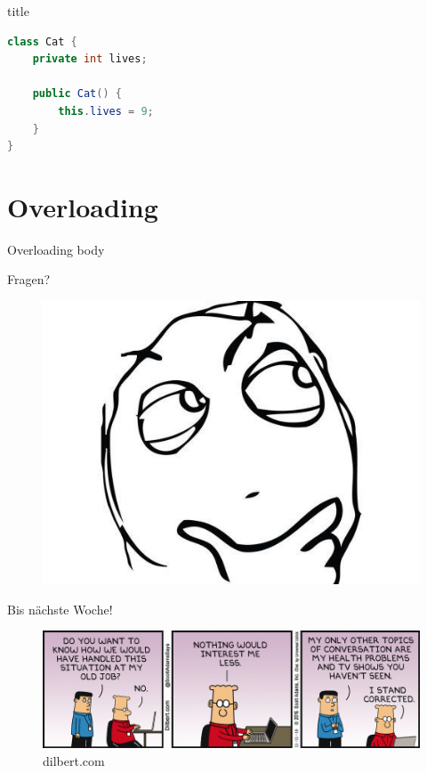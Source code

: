 \documentclass[18pt]{beamer}
\begin{document}
\begin{frame}[fragile]{title}
    \begin{exampleblock}{}
        \begin{lstlisting}[language=Java]
class Cat {
    private int lives;

    public Cat() {
        this.lives = 9;
    }
}
        \end{lstlisting}

    \end{exampleblock}

\end{frame}



\section{Overloading}

\begin{frame}{Overloading}
    body
\end{frame}

\appendix

\beginbackup

\begin{frame}{Fragen?}
    \begin{figure}
        \includegraphics[scale=.32]{img/Question-Rage-Face.jpg}
    \end{figure}
\end{frame}

\begin{frame}{Bis nächste Woche!}
    \begin{figure}
        \includegraphics[scale=.32]{img/dt161111.jpg}
        \caption{\footnotesize{dilbert.com}}
    \end{figure}
\end{frame}

\backupend
\end{document}
